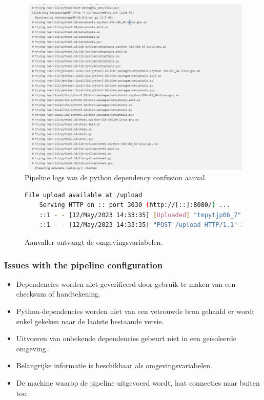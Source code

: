 \begin{figure}[H]
  \includegraphics[scale=0.45]{graphics/pythondependencyattack.png}
\caption{\label{fig:3thattack} Pipeline logs van de python dependency confusion aanval.}
\end{figure}

\begin{figure}[H]
  \begin{lstlisting}[language=bash, style=bashstyle]
    File upload available at /upload
    Serving HTTP on :: port 3030 (http://[::]:8080/) ...
    ::1 - - [12/May/2023 14:33:35] [Uploaded] "tmpytjp06_7" --> /home/ubuntu/tmpytjp06_7
    ::1 - - [12/May/2023 14:33:35] "POST /upload HTTP/1.1" 204 -
  \end{lstlisting}
\caption{\label{fig:4thattack} Aanvaller ontvangt de omgevingsvariabelen.}
\end{figure}

\subsubsection{
{Issues with the pipeline configuration}}
\label{sec:Problemen met de pipeline configuratie}

\begin{itemize}
  \item Dependencies worden niet geverifieerd door gebruik te maken van een checksum of handtekening.
  \item Python-dependencies worden niet van een vetrouwde bron gehaald er wordt enkel gekeken naar de laatste bestaande versie.
  \item Uitvoeren van onbekende dependencies gebeurt niet in een geïsoleerde omgeving.
  \item Belangrijke informatie is beschikbaar als omgevingsvariabelen.
  \item De machine waarop de pipeline uitgevoerd wordt, laat connecties naar buiten toe.
\end{itemize}

